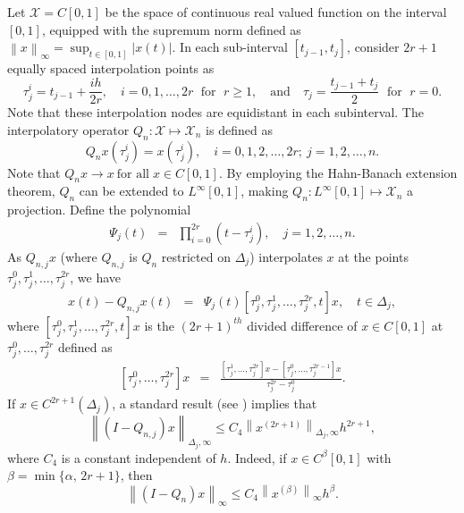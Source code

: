 \documentclass[pdflatex, sn-mathphys-num]{sn-jnl}%
\newcommand{\norm}[1]{\left\lVert #1\right\rVert}
\theoremstyle{thmstyleone}%
\theoremstyle{thmstyletwo}%
\theoremstyle{thmstylethree}%
\begin{document}
Let $\mathcal{X} = C[0,1]$ be the space of continuous real valued function on the interval $[0, 1]$,  equipped with the supremum norm defined as \(\norm{x}_\infty =  \sup_{t \in [0,1]}  \left|x(t)\right|\). In each sub-interval $[t_{j-1}, t_j]$, consider $2r+1$ equally spaced interpolation points as
\begin{equation*}
	\tau_j^i = t_{j-1} + \frac{ih}{2r}, \quad i = 0, 1, \ldots, 2r  \; \text{ for } \; r \geq 1, \quad \text{and} \quad \tau_j = \frac{t_{j-1} + t_j}{2} \; \text{ for }  \; r = 0.
\end{equation*}
Note that these interpolation nodes are equidistant in each subinterval. The interpolatory operator $Q_n : \mathcal{X} \mapsto \mathcal{X}_n $ is defined as
\begin{equation} \label{Eq: 0011}
	Q_nx(\tau_j^i) = x(\tau_j^i), \quad i = 0, 1, 2, \ldots, 2r; ~ j = 1, 2, \ldots, n.
\end{equation}
Note that \(Q_nx \to x ~ \text{for all} \; x \in C[0,1]\). By employing the Hahn-Banach extension theorem, \(Q_n\) can be extended to \(L^\infty[0,1]\), making \(Q_n : L^\infty[0,1] \mapsto \mathcal{X}_n\) a projection. Define the polynomial 
\begin{eqnarray*}
	\Psi_j(t) & = & \prod_{i=0}^{2r} \left(t - \tau_j^i \right), \quad j = 1, 2, \ldots, n.
\end{eqnarray*}
As \(Q_{n,j}x\) (where \(Q_{n,j}\) is \(Q_{n}\) restricted on \(\Delta_j\)) interpolates \(x\) at the points \(\tau_j^0, \tau_j^1, \ldots, \tau_j^{2r}\), we have
\begin{eqnarray*}
	x(t) - Q_{n,j}x(t) & = & \Psi_j(t) \left[\tau_j^0, \tau_j^1, \ldots, \tau_j^{2r}, t\right]x, \quad t \in \Delta_j,
\end{eqnarray*}
where $\left[\tau_j^0, \tau_j^1, \ldots, \tau_j^{2r}, t\right]x$ is the $(2r+1)^{th}$ divided difference of $x \in C[0, 1]$ at $\tau_j^0, \ldots, \tau_j^{2r}$ defined as
\begin{eqnarray*}
	\left[\tau_j^0, \ldots, \tau_j^{2r}\right]x &=& \frac{\left[\tau_j^1, \ldots, \tau_j^{2r}\right]x - \left[\tau_j^0, \ldots, \tau_j^{2r-1}\right]x}{\tau_j^{2r} - \tau_j^0}.
\end{eqnarray*}
If \(x \in C^{2r+1}(\Delta_j)\), a standard result (see \cite{KEA-IG-IS}) implies that
\begin{equation*} 
	\norm{(I-Q_{n,j})x}_{\Delta_j, \infty}  \leq C_4 \norm{x^{(2r+1)}}_{\Delta_j, \infty} h^{2r+1},
\end{equation*}
where $C_4$ is a constant independent of $h$. Indeed, if $x \in C^{\beta}[0,1]$ with $\beta = \min\{\alpha,\, 2r+1\}$, then
\begin{equation} \label{Eq: 0012}
	\norm{(I - Q_{n})x}_\infty \leq C_4 \norm{x^{(\beta)}}_\infty h^{\beta}.
\end{equation}
\end{document}
